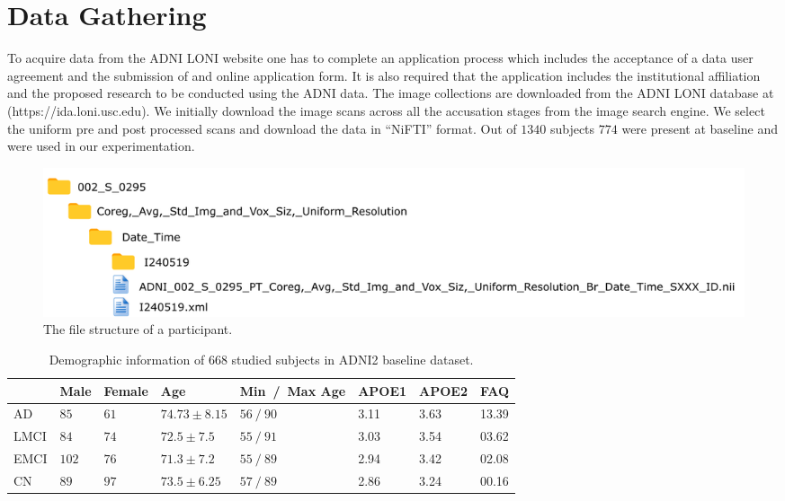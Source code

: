 \section{Data Gathering}
\label{sec:data_gathering}
To acquire \FDGPET data from the ADNI LONI website one has to complete an application process which includes the acceptance of a data user agreement and the submission of and online application form. It is also required that the application includes the institutional affiliation and the proposed research to be conducted using the ADNI data. The image collections are downloaded from the ADNI LONI database at (https://ida.loni.usc.edu). We initially download the image scans across all the accusation stages from the image search engine. We select the uniform pre and post processed scans and download the data in ``NiFTI'' format. Out of $1340$ subjects $774$ were present at baseline and were used in our experimentation.
\begin{figure}[h]
	\centering
	\includegraphics[width=\linewidth]{figures/file_structure}
	\caption[The file structure of downloaded data.]{The file structure of a participant.}
	\label{fig:filestructure}
\end{figure}

\begin{table}[t]
	\begin{center}
		\caption{Demographic information of $668$ studied subjects in ADNI2 baseline dataset.}\label{tab:demographic}
		\begin{tabular}{|P{1.5cm}|P{1cm}P{1cm}P{2.25cm}P{3cm}P{1.25cm}P{1.25cm}P{1.25cm}|}
			\hline
			& Male & Female & Age & Min~/~Max Age & APOE1 & APOE2 & FAQ \\
			\hline\hline
			AD 		& $85$ 	& $61$ & $74.73 \pm 8.15$ 	& $56~/~90$ &	3.11 & 3.63 & 13.39\\
			LMCI 	& $84$ 	& $74$ & $72.5 	\pm 7.5$ 	& $55~/~91$ &	3.03 & 3.54 & 03.62\\
			EMCI 	& $102$ & $76$ & $ 71.3 \pm 7.2 $	& $55~/~89$ &	2.94 & 3.42 & 02.08\\
			CN 		& $89$ 	& $97$ & $ 73.5 \pm 6.25 $ 	& $57~/~89$ &	2.86 & 3.24 & 00.16\\
			\hline
		\end{tabular}
	\end{center}
\end{table}

